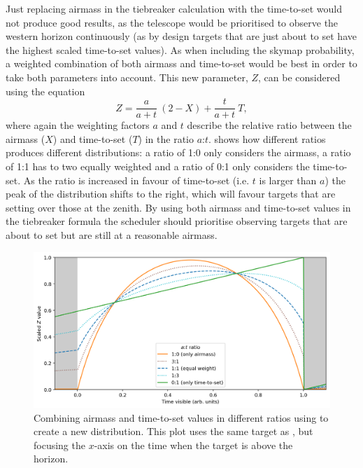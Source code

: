 \begin{colsection}
\begin{colsection}
Just replacing airmass in the tiebreaker calculation with the time-to-set would not produce good results, as the telescope would be prioritised to observe the western horizon continuously (as by design targets that are just about to set have the highest scaled time-to-set values). As when including the skymap probability, a weighted combination of both airmass and time-to-set would be best in order to take both parameters into account. This new parameter, $Z$, can be considered using the equation
%
\begin{equation}
    Z = \frac{a}{a+t}~(2-X) + \frac{t}{a+t}~T,
    \label{eq:at_ratio}
\end{equation}
%
where again the weighting factors $a$ and $t$ describe the relative ratio between the airmass ($X$) and time-to-set ($T$) in the ratio $a$:$t$.  shows how different ratios produces different distributions: a ratio of 1:0 only considers the airmass, a ratio of 1:1 has to two equally weighted and a ratio of 0:1 only considers the time-to-set. As the ratio is increased in favour of time-to-set (i.e. $t$ is larger than $a$) the peak of the distribution shifts to the right, which will favour targets that are setting over those at the zenith. By using both airmass and time-to-set values in the tiebreaker formula the scheduler should prioritise observing targets that are about to set but are still at a reasonable airmass.

\begin{figure}[t]
    \begin{center}
        \includegraphics[width=\linewidth]{images/at_ratio.png}
    \end{center}
    \caption[Combining airmass and time-to-set values]{
        Combining airmass and time-to-set values in different ratios using  to create a new distribution. This plot uses the same target as , but focusing the $x$-axis on the time when the target is above the horizon.
    }\label{fig:at_ratio}
\end{figure}


\end{colsection}
\end{colsection}
